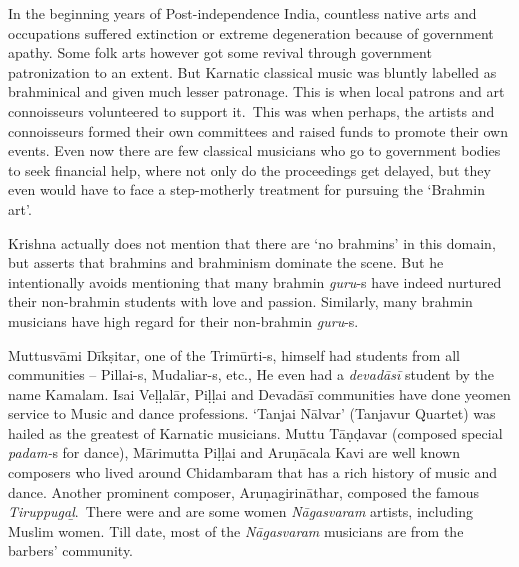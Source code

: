 In the beginning years of Post-independence India, countless native arts and occupations suffered extinction or extreme degeneration because of government apathy. Some folk arts however got some revival through government patronization to an extent. But Karnatic classical music was bluntly labelled as brahminical and given much lesser patronage. This is when local patrons and art connoisseurs volunteered to support it.~This was when perhaps, the artists and connoisseurs formed their own committees and raised funds to promote their own events. Even now there are few classical musicians who go to government bodies to seek financial help, where not only do the proceedings get delayed, but they even would have to face a step-motherly treatment for pursuing the ‘Brahmin art’.

Krishna actually does not mention that there are ‘no brahmins’ in this domain, but asserts that brahmins and brahminism dominate the scene. But he intentionally avoids mentioning that many brahmin \textit{guru}-s have indeed nurtured their non-brahmin students with love and passion. Similarly, many brahmin musicians have high regard for their non-brahmin \textit{guru}-s.

Muttusvāmi Dīkṣitar, one of the Trimūrti-s, himself had students from all communities – Pillai-s, Mudaliar-s, etc., He even had a \textit{devadāsī} student by the name Kamalam. Isai Veḷḷalār, Piḷḷai and Devadāsī communities have done yeomen service to Music and dance professions. ‘Tanjai Nālvar’ (Tanjavur Quartet) was hailed as the greatest of Karnatic musicians. Muttu Tāṇḍavar (composed special \textit{padam-}s for dance), Mārimutta Piḷḷai and Aruṇācala Kavi are well known composers who lived around Chidambaram that has a rich history of music and dance. Another prominent composer, Aruṇagirināthar, composed the famous \textit{Tiruppugaḻ}.~There were and are some women \textit{Nāgasvaram} artists, including Muslim women. Till date, most of the \textit{Nāgasvaram} musicians are from the barbers’ community.

